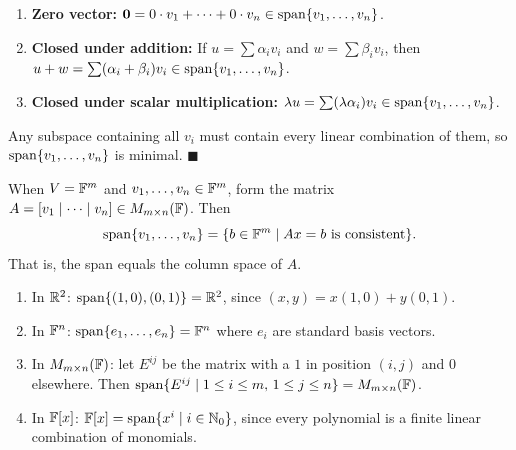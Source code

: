 \begin{proofbox}
\begin{enumerate}[label=(\roman*)]
    \item \textbf{Zero vector:}
          $\mathbf{0} = 0\cdot v_1 + \cdots + 0\cdot v_n \in \operatorname{span}\{v_1,\ldots,v_n\}$.
    \item \textbf{Closed under addition:}
          If $u = \sum\alpha_i v_i$ and $w = \sum\beta_i v_i$, then
          $u+w = \sum(\alpha_i+\beta_i)v_i \in \operatorname{span}\{v_1,\ldots,v_n\}$.
    \item \textbf{Closed under scalar multiplication:}
          $\lambda u = \sum(\lambda\alpha_i)v_i \in \operatorname{span}\{v_1,\ldots,v_n\}$.
\end{enumerate}
Any subspace containing all $v_i$ must contain every linear combination of
them, so $\operatorname{span}\{v_1,\ldots,v_n\}$ is minimal.
\hfill$\blacksquare$
\end{proofbox}

\begin{tipbox}
\label{rem:span-matrix}
When $V = \mathbb{F}^m$ and $v_1,\ldots,v_n\in\mathbb{F}^m$, form the matrix
$A = [v_1\mid\cdots\mid v_n]\in M_{m\times n}(\mathbb{F})$.  Then
\[
    \operatorname{span}\{v_1,\ldots,v_n\}
    = \{b\in\mathbb{F}^m \mid Ax = b \text{ is consistent}\}.
\]
That is, the span equals the column space of $A$.
\end{tipbox}

\begin{exbox}
\begin{enumerate}
    \item In $\mathbb{R}^2$: $\operatorname{span}\{(1,0),(0,1)\} = \mathbb{R}^2$, since
          $(x,y) = x(1,0)+y(0,1)$.

    \item In $\mathbb{F}^n$: $\operatorname{span}\{e_1,\ldots,e_n\} = \mathbb{F}^n$ where $e_i$ are standard
          basis vectors.

    \item In $M_{m\times n}(\mathbb{F})$: let $E^{ij}$ be the matrix with a $1$ in position
          $(i,j)$ and $0$ elsewhere.  Then
          $\operatorname{span}\{E^{ij}\mid 1\le i\le m,\,1\le j\le n\} = M_{m\times n}(\mathbb{F})$.

    \item In $\mathbb{F}[x]$: $\mathbb{F}[x] = \operatorname{span}\{x^i\mid i\in\mathbb{N}_0\}$, since every polynomial
          is a finite linear combination of monomials.
\end{enumerate}
\end{exbox}

